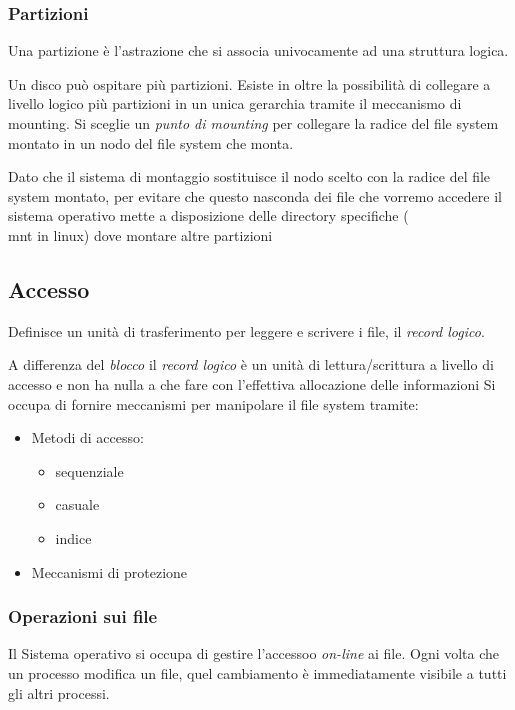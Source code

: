 \documentclass
[10pt,        %
 a4paper,     %
 onecolumn,   %
 fleqn,       %
 oneside,     %
 notitlepage, %
]{article}    %
\begin{document}
\subsubsection{Partizioni}
Una partizione è l'astrazione che si associa univocamente ad una struttura logica.

Un disco può ospitare più partizioni. Esiste in oltre la possibilità di collegare a livello logico più partizioni in un unica gerarchia tramite il meccanismo di mounting. Si sceglie un \textit{punto di mounting} per collegare la radice del file system montato in un nodo del file system che monta.

Dato che il sistema di montaggio sostituisce il nodo scelto con la radice del file system montato, per evitare che questo nasconda dei file che vorremo accedere il sistema operativo mette a disposizione delle directory specifiche (\\mnt in linux) dove montare altre partizioni

\subsection{Accesso}
Definisce un unità di trasferimento per leggere e scrivere i file, il \textit{record logico}. 

A differenza del \textit{blocco} il \textit{record logico} è un unità di lettura/scrittura a livello di accesso e non ha nulla a che fare con l'effettiva allocazione delle informazioni 
Si occupa di fornire meccanismi per manipolare il file system tramite:
\begin{itemize}
    \item Metodi di accesso:
    \begin{itemize}
        \item sequenziale
        \item casuale
        \item indice
    \end{itemize}
    \item Meccanismi di protezione
\end{itemize}

\subsubsection{Operazioni sui file}
Il Sistema operativo si occupa di gestire l'accessoo \textit{on-line} ai file. Ogni volta che un processo modifica un file, quel cambiamento è immediatamente visibile a tutti gli altri processi.
\end{document}
